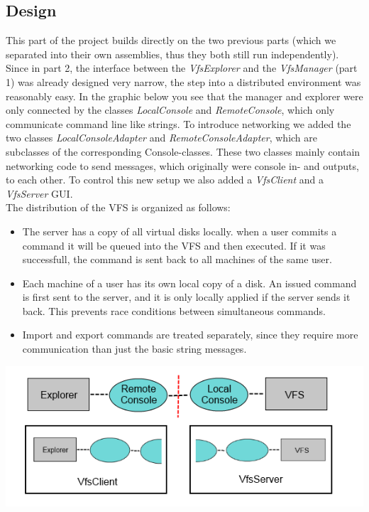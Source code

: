 \documentclass[a4paper,12pt]{article}
\begin{document}
\subsection{Design}

This part of the project builds directly on the two previous parts (which we separated into their own assemblies, thus they both still run independently). Since in part 2, the interface between the \emph{VfsExplorer} and the \emph{VfsManager} (part 1) was already designed very narrow, the step into a distributed environment was reasonably easy. In the graphic below you see that the manager and explorer were only connected by the classes \emph{LocalConsole} and \emph{RemoteConsole}, which only communicate command line like strings. To introduce networking we added the two classes \emph{LocalConsoleAdapter} and \emph{RemoteConsoleAdapter}, which are subclasses of the corresponding Console-classes. These two classes mainly contain networking code to send messages, which originally were console in- and outputs, to each other. To control this new setup we also added a \emph{VfsClient} and a \emph{VfsServer} GUI. \\
The distribution of the VFS is organized as follows:

\begin{itemize}
\item The server has a copy of all virtual disks locally. when a user commits a command it will be queued into the VFS and then executed. If it was successfull, the command is sent back to all machines of the same user.
\item Each machine of a user has its own local copy of a disk. An issued command is first sent to the server, and it is only locally applied if the server sends it back. This prevents race conditions between simultaneous commands.
\item Import and export commands are treated separately, since they require more communication than just the basic string messages.
\end{itemize}


\includegraphics[scale=0.8] {design}
\end{document}
